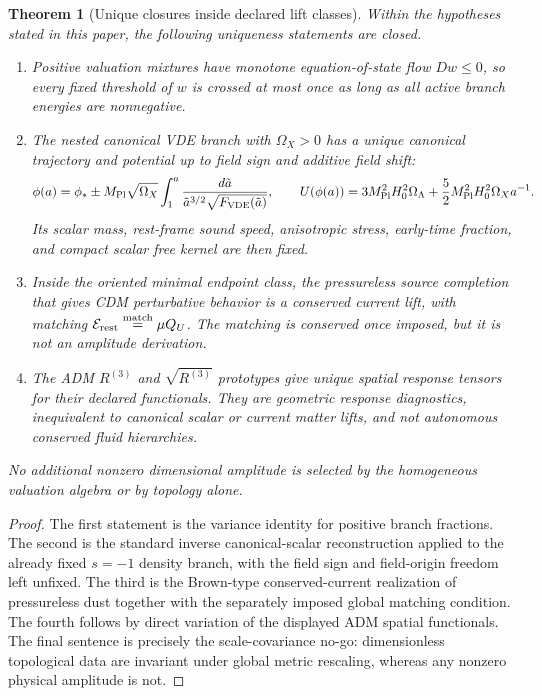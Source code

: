 \documentclass[11pt,a4paper]{article}
\def\dd{d}%
\def\Dil{D}%
\def\QU{Q_U}%
\numberwithin{equation}{section}
\theoremstyle{definition}
\theoremstyle{plain}
\newtheorem{theorem}[criterion]{Theorem}
\theoremstyle{remark}
\newcommand{\Dil}{\mathscr{D}}
\newcommand{\dd}{\mathrm{d}}
\newcommand{\QU}{Q_U}
\begin{document}
\begin{theorem}[Unique closures inside declared lift classes]
Within the hypotheses stated in this paper, the following uniqueness statements
are closed.
\begin{enumerate}
\item Positive valuation mixtures have monotone equation-of-state flow
\(\Dil w\le0\), so every fixed threshold of \(w\) is crossed at most once as
long as all active branch energies are nonnegative.
\item The nested canonical VDE branch with \(\Omega_X>0\) has a unique
canonical trajectory and potential up to field sign and additive field shift:
\begin{equation}
\phi(a)=\phi_*\pm M_{\rm Pl}\sqrt{\Omega_X}
\int_1^a\frac{\dd\tilde a}{\tilde a^{3/2}\sqrt{F_{\rm VDE}(\tilde a)}},
\qquad
U(\phi(a))=3M_{\rm Pl}^2H_0^2\Omega_\Lambda
+\frac52M_{\rm Pl}^2H_0^2\Omega_Xa^{-1}.
\end{equation}
Its scalar mass, rest-frame sound speed, anisotropic stress, early-time
fraction, and compact scalar free kernel are then fixed.
\item Inside the oriented minimal endpoint class, the pressureless source
completion that gives CDM perturbative behavior is a conserved current lift,
with matching \(\mathcal E_{\rm rest}\overset{\rm match}{=}\mu\QU\).  The
matching is conserved once imposed, but it is not an amplitude derivation.
\item The ADM \(R^{(3)}\) and \(\sqrt{R^{(3)}}\) prototypes give unique
spatial response tensors for their declared functionals.  They are geometric
response diagnostics, inequivalent to canonical scalar or current matter
lifts, and not autonomous conserved fluid hierarchies.
\end{enumerate}
No additional nonzero dimensional amplitude is selected by the homogeneous
valuation algebra or by topology alone.
\end{theorem}
\begin{proof}
The first statement is the variance identity for positive branch fractions.
The second is the standard inverse canonical-scalar reconstruction applied to
the already fixed \(s=-1\) density branch, with the field sign and field-origin
freedom left unfixed.  The third is the Brown-type conserved-current
realization of pressureless dust together with the separately imposed global
matching condition.  The fourth follows by direct variation of the displayed
ADM spatial functionals.  The final sentence is precisely the scale-covariance
no-go: dimensionless topological data are invariant under global metric
rescaling, whereas any nonzero physical amplitude is not.
\end{proof}
\end{document}
